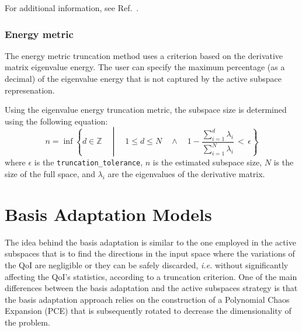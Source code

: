 For additional information, see Ref.~\cite{bing-li}.

\subsubsection{Energy metric}\label{SubSec:energy}
The energy metric truncation method uses a criterion based on the derivative matrix
eigenvalue energy. The user can specify the maximum percentage (as a decimal) of
the eigenvalue energy that is not captured by the active subspace represenation.

Using the eigenvalue energy truncation metric, the subspace size is determined using the following equation:
$$n = \inf \left\lbrace d \in \mathbb{Z} \quad\middle|\quad 1 \le d \le N \quad \wedge\quad 1 - \frac{\sum_{i = 1}^{d} \lambda_i}{\sum_{i = 1}^{N} \lambda_i} \,<\, \epsilon \right\rbrace $$
where $\epsilon$ is the \texttt{truncation\_tolerance}, $n$ is the estimated subspace size, $N$ is the size of the full space, and $\lambda_i$ are the eigenvalues of the derivative matrix.



\section{Basis Adaptation Models}\label{Chap:BasAdapt}
The idea behind the basis adaptation is similar to the one employed in the active subspaces that is to find the directions
in the input space where the variations of the QoI are negligible or they can be safely discarded, \textit{i.e.} without significantly affecting the QoI's statistics, 
according to a truncation criterion. One of the main differences between the basis adaptation and
the active subspaces strategy is that the basis adaptation approach relies on the construction of a Polynomial Chaos Expansion (PCE) that is 
subsequently rotated to decrease the dimensionality of the problem.

